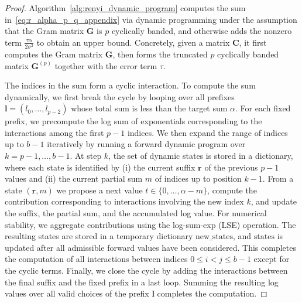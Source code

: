 \documentclass{article}
\theoremstyle{plain}
\theoremstyle{definition}
\theoremstyle{remark}
\begin{document}
\begin{proof}
Algorithm~\ref{alg:renyi_dynamic_program} computes the sum in~\eqref{eq:r_alpha_p_q_appendix} via dynamic programming under the assumption that the Gram matrix $\mathbf{G}$ is $p$ cyclically banded, and otherwise adds the nonzero term $\frac{\tau\alpha}{2\sigma^2}$ to obtain an upper bound. Concretely, given a matrix $\mathbf{C}$, it first computes the Gram matrix $\mathbf{G}$, then forms the truncated $p$ cyclically banded matrix $\mathbf{G}^{(p)}$ together with the error term $\tau$.

The indices in the sum form a cyclic interaction. To compute the sum dynamically, we first break the cycle by looping over all prefixes $\mathbf{l}=(l_0,\dots,l_{p-2})$ whose total sum is less than the target sum $\alpha$. For each fixed prefix, we precompute the log sum of exponentials corresponding to the interactions among the first $p-1$ indices. We then expand the range of indices up to $b-1$ iteratively by running a forward dynamic program over $k=p-1,\dots,b-1$. At step $k$, the set of dynamic states is stored in a dictionary, where each state is identified by (i) the current suffix $\mathbf{r}$ of the previous $p-1$ values and (ii) the current partial sum $m$ of indices up to position $k-1$. From a state $(\mathbf{r},m)$ we propose a next value $t\in\{0,\dots,\alpha-m\}$, compute the contribution corresponding to interactions involving the new index $k$, and update the suffix, the partial sum, and the accumulated log value. For numerical stability, we aggregate contributions using the log-sum-exp (LSE) operation. The resulting states are stored in a temporary dictionary $\mathrm{new\_states}$, and $\mathrm{states}$ is updated after all admissible forward values have been considered. This completes the computation of all interactions between indices $0\le i<j\le b-1$ except for the cyclic terms. Finally, we close the cycle by adding the interactions between the final suffix and the fixed prefix in a last loop. Summing the resulting log values over all valid choices of the prefix $\mathbf{l}$ completes the computation.
 

\end{proof}
\end{document}
